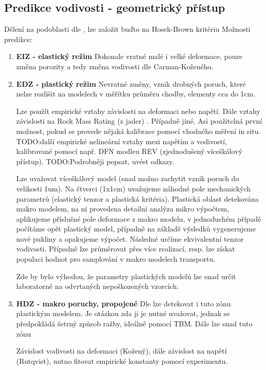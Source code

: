 \documentclass{article}
\def\todo#1{{TODO:\color{red}#1}}
\begin{document}
\subsection{Predikce vodivosti - geometrický přístup}
Dělení na podoblasti dle \cite{Perras2016}, lze založit buďto na 
Hosek-Brown kritériu \cite{}
\cite{Hajiabdolmajid2002}
Možnosti predikce:
\begin{enumerate}
    \item {\bf EIZ - elastický režim} Dokonale vratné malé i velké deformace, pouze změna porozity a tedy změna vodivosti dle Carman-Koženého.
    \item {\bf EDZ - plastický režim} Nevratné změny, vznik drobných poruch, které nelze rozlišit na modelech v měřítku průměru chodby, elementy cca do 1cm. 
    
    Lze použít empirické vztahy \cite{Rutqvist2009} závislosti na deformaci nebo napětí. Dále vztahy závislosti na Rock Mass Rating (z jader) \cite{Liu1999}. Případně jiné. 
    Asi použitelná první možnost, pokud se provede nějaká kalibrace pomocí vhodného měření in situ. \todo{další empirické nelineární vztahy mezi napětím a vodivostí, kalibrované pomocí 
    např. DFN modleu REV (zjednodušený víceškálový přístup).}
    \todo{Podrobněji popsat, uvést odkazy.}
    
    
    Lze uvažovat víceškálový model (snad možno zachytit vznik poruch do velikosti 1um). Na čtverci (1x1cm) uvažujeme náhodné pole mechanických parametrů (elastický tenzor a plastická kritéria). Plastická oblast detekována makro modelem, na ní provedena detailní analýza mikro výpočtem, aplikujeme příslušné pole deformace z makro modelu, v jednoduchém případě počítáme opět plastický model, případně na základě výsledků vygenerujeme nové pukliny a opakujeme výpočet. Následně určíme ekvivalentní tenzor vodivosti. Případně lze průměrovat přes více realizací, resp. lze získat populaci hodnot pro samplování v makro modelech transportu. 
    
    Zde by bylo výhodou, že parametry plastických modelů lze snad určit laboratorně na odvrtaných nepoškozených vzorcích.
    
    \item {\bf HDZ - makro poruchy, propojené} 
    Dle \cite{Perras2016} lze detekovat i tuto zónu plastickým modelem. Je otázkou zda ji je nutné uvažovat, jednak se předpokládá šetrný způsob ražby, ideálně pomocí TBM. Dále lze snad tuto zónu   
    
    Závislost vodivosti na deformaci (Kožený), dále závislost na napětí (Rutqvist), nutno fitovat empirické konstanty pomocí experimentu. 
\end{enumerate}
\end{document}
